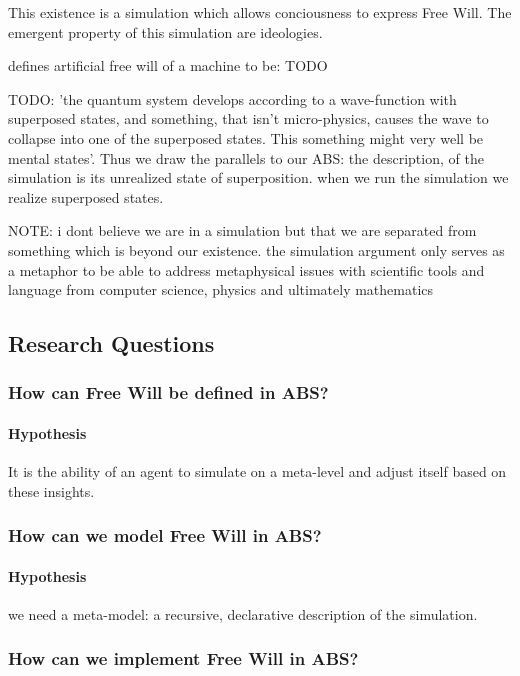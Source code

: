 \documentclass{article}
\begin{document}
\begin{corollary}
This existence is a simulation which allows conciousness to express Free Will. The emergent property of this simulation are ideologies.
\end{corollary}

\cite{irtem_simulation_1978} defines artificial free will of a machine to be: TODO

TODO: 'the quantum system develops according to a wave-function with superposed states, and something, that isn't micro-physics, causes the wave to collapse into one of the superposed states. This something might very well be mental states'. Thus we draw the parallels to our ABS: the description, of the simulation is its unrealized state of superposition. when we run the simulation we realize superposed states. 

NOTE:  i dont believe we are in a simulation but that we are separated from something which is beyond our existence. the simulation argument only serves as a metaphor to be able to address metaphysical issues with scientific tools and language from computer science, physics and ultimately mathematics

\subsection{Research Questions}

\subsubsection{How can Free Will be defined in ABS?}
\paragraph{Hypothesis} It is the ability of an agent to simulate on a meta-level and adjust itself based on these insights.

\subsubsection{How can we model Free Will in ABS?}
\paragraph{Hypothesis} we need a meta-model: a recursive, declarative description of the simulation.

\subsubsection{How can we implement Free Will in ABS?}
\end{document}
